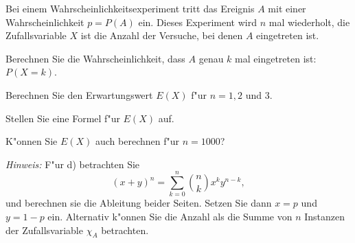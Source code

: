 Bei einem Wahrscheinlichkeitsexperiment tritt das Ereignis $A$
mit einer Wahrscheinlichkeit $p=P(A)$ ein. Dieses Experiment wird
$n$ mal wiederholt, die Zufallsvariable $X$ ist die Anzahl der
Versuche, bei denen $A$ eingetreten ist.
\begin{teilaufgaben}
\item Berechnen Sie die Wahrscheinlichkeit, dass $A$ genau $k$
mal eingetreten ist: $P(X=k)$.
\item Berechnen Sie den Erwartungswert $E(X)$ f"ur $n=1,2$ und $3$.
\item Stellen Sie eine Formel f"ur $E(X)$ auf.
\item K"onnen Sie $E(X)$ auch berechnen f"ur $n=1000$?
\end{teilaufgaben}
{\it Hinweis:} F"ur d) betrachten Sie
\[
(x+y)^n=\sum_{k=0}^n\binom{n}{k}x^ky^{n-k},
\]
und berechnen sie die Ableitung beider Seiten.
Setzen Sie dann $x=p$ und $y=1-p$ ein. Alternativ k"onnen Sie die
Anzahl als die Summe von $n$ Instanzen der Zufallsvariable $\chi_A$
betrachten.

